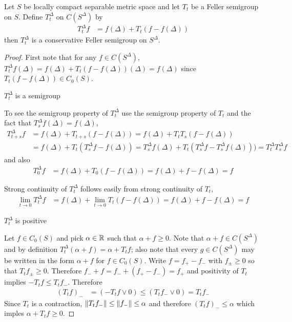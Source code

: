 \begin{prop}\label{FellerSemigroupCompactification}Let $S$ be locally compact separable metric space and let $T_t$ be a Feller semigroup on $S$.  Define $T^\Delta_t$ on $C(S^\Delta)$ by
\begin{align*}
T^\Delta_t f &= f(\Delta) + T_t (f - f(\Delta))
\end{align*}
then $T^\Delta_t$ is a conservative Feller semigroup on $S^\Delta$.
\end{prop}
\begin{proof}
First note that for any $f \in C(S^\Delta)$, $T^\Delta_t f (\Delta) = f(\Delta) + T_t (f - f(\Delta)) (\Delta) = f(\Delta)$ since $T_t (f - f(\Delta)) \in C_0(S)$.
\begin{clm} $T^\Delta_t$ is a semigroup
\end{clm}
To see the semigroup property of $T^\Delta_t$ use the semigroup property of $T_t$ and the fact that $T^\Delta_s f(\Delta) = f(\Delta)$,
\begin{align*}
T^\Delta_{t + s} f &= f(\Delta) + T_{t + s} (f - f(\Delta)) = f(\Delta) + T_{t} T_{s} (f - f(\Delta)) \\
&=f(\Delta) + T_t (T^\Delta_{s} f - f(\Delta)) = T^\Delta_s f(\Delta) + T_{t} (T^\Delta_{s} f - T^\Delta_s f(\Delta))) = T^\Delta_t T^\Delta_s f
\end{align*}
and also
\begin{align*}
T^\Delta_0 f &= f(\Delta) + T_0 (f - f(\Delta)) = f(\Delta) + f - f(\Delta) = f
\end{align*}

Strong continuity of $T^\Delta_t$ follows easily from strong continuity of $T_t$,
\begin{align*}
\lim_{t \to 0} T^\Delta_t f &= f(\Delta) + \lim_{t \to 0} T_t (f - f(\Delta)) = f(\Delta) + f - f(\Delta) =f
\end{align*}

\begin{clm}$T^\Delta_t$ is positive
\end{clm}
Let $f \in C_0(S)$ and pick $\alpha \in \mathbb{R}$ such that $\alpha + f \geq 0$.  Note that $\alpha + f \in C(S^\Delta)$ and by definition $T^\Delta_t (\alpha + f) = \alpha + T_t f$; also note that every $g \in C(S^\Delta)$ may be written in the form $\alpha + f$ for $f \in C_0(S)$.
Write $f = f_+ - f_-$ with $f_\pm \geq 0$ so that $T_t f_\pm \geq 0$.  Therefore $f_- + f = f_- + (f_+ - f_-) = f_+$ and positivity of $T_t$ implies $-T_t f \leq T_t f_-$.  Therefore
\begin{align*}
(T_t f)_- &= (-T_t f \vee 0) \leq (T_t f_- \vee 0) = T_t f_-
\end{align*}
Since $T_t$ is a contraction, $\left \lVert T_t f_- \right \rVert \leq \left \lVert f_- \right \rVert \leq \alpha$ and therefore $(T_tf)_- \leq \alpha$ which imples $\alpha + T_t f \geq 0$.


\end{proof}
